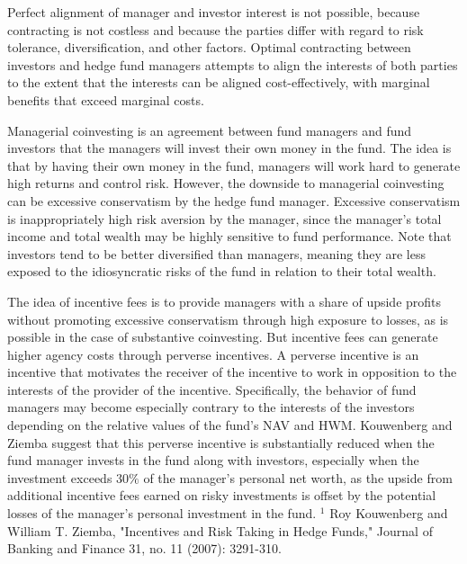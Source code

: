 \documentclass[11pt]{article}
\begin{document}
Perfect alignment of manager and investor interest is not possible, because contracting is not costless and because the parties differ with regard to risk tolerance, diversification, and other factors. Optimal contracting between investors and hedge fund managers attempts to align the interests of both parties to the extent that the interests can be aligned cost-effectively, with marginal benefits that exceed marginal costs.

Managerial coinvesting is an agreement between fund managers and fund investors that the managers will invest their own money in the fund. The idea is that by having their own money in the fund, managers will work hard to generate high returns and control risk. However, the downside to managerial coinvesting can be excessive conservatism by the hedge fund manager. Excessive conservatism is inappropriately high risk aversion by the manager, since the manager's total income and total wealth may be highly sensitive to fund performance. Note that investors tend to be better diversified than managers, meaning they are less exposed to the idiosyncratic risks of the fund in relation to their total wealth.

The idea of incentive fees is to provide managers with a share of upside profits without promoting excessive conservatism through high exposure to losses, as is possible in the case of substantive coinvesting. But incentive fees can generate higher agency costs through perverse incentives. A perverse incentive is an incentive that motivates the receiver of the incentive to work in opposition to the interests of the provider of the incentive. Specifically, the behavior of fund managers may become especially contrary to the interests of the investors depending on the relative values of the fund's NAV and HWM. Kouwenberg and Ziemba suggest that this perverse incentive is substantially reduced when the fund manager invests in the fund along with investors, especially when the investment exceeds $30 \%$ of the manager's personal net worth, as the upside from additional incentive fees earned on risky investments is offset by the potential losses of the manager's personal investment in the fund. ${ }^{1}$ Roy Kouwenberg and William T. Ziemba, "Incentives and Risk Taking in Hedge Funds," Journal of Banking and Finance 31, no. 11 (2007): 3291-310.
\end{document}
